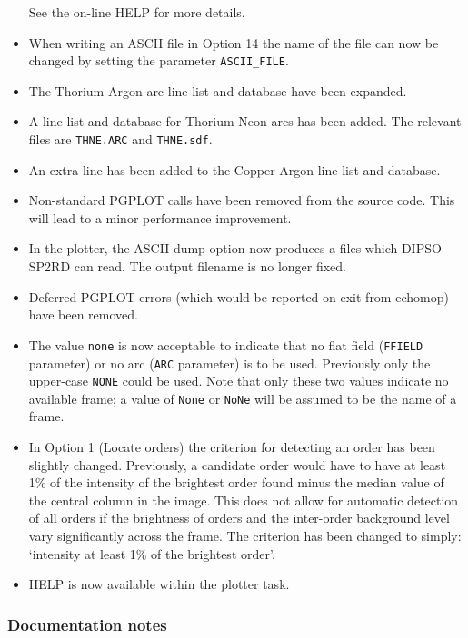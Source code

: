 \documentclass[11pt,twoside]{article}
\newcommand{\htmlref}[2]{#1}
\begin{document}
\begin{itemize}
   See the on-line HELP for more details.
\item When writing an ASCII file in Option 14 the name of the file can
   now be changed by setting the parameter
   \htmlref{{\tt{ASCII\_FILE}}}{par_ASCII_FILE}.
\item The Thorium-Argon arc-line list and database have been expanded.
\item A line list and database for Thorium-Neon arcs has been added.
   The relevant files are \texttt{THNE.ARC} and \texttt{THNE.sdf}.
\item An extra line has been added to the Copper-Argon line list and
   database.
\item Non-standard PGPLOT calls have been removed from the source code.
   This will lead to a minor performance improvement.
\item In the plotter, the ASCII-dump option now produces a files which
   DIPSO SP2RD can read.  The output filename is no longer fixed.
\item Deferred PGPLOT errors (which would be reported on exit from
   {\sc echomop}) have been removed.
\item The value \texttt{none} is now acceptable to indicate that no flat
   field (\htmlref{{\tt{FFIELD}}}{par_FFIELD} parameter) or no arc
   (\htmlref{{\tt{ARC}}}{par_ARC} parameter) is to  be used.
   Previously only the upper-case \texttt{NONE} could be used.  Note that
   only these two values indicate no available frame; a value of
   \texttt{None} or \texttt{NoNe} will be assumed to be the name of a frame.
\item In Option 1 (Locate orders) the criterion for detecting an order
   has been slightly changed.  Previously, a candidate order would
   have to have at least 1\% of the intensity of the brightest order
   found minus the median value of the central column in the image.
   This does not allow for automatic detection of all orders if the
   brightness of orders and the inter-order background level vary
   significantly across the frame.  The criterion has been changed
   to simply: `intensity at least 1\% of the brightest order'.
\item HELP is now available within the plotter task.
\end{itemize}

\subsubsection{Documentation notes}
\end{document}
